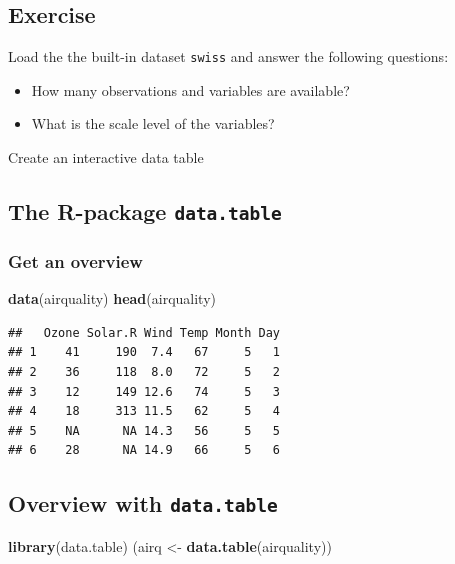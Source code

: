 \documentclass[10pt,]{article}
\newenvironment{Shaded}{\begin{snugshade}}{\end{snugshade}}
\newcommand{\KeywordTok}[1]{\textcolor[rgb]{0.13,0.29,0.53}{\textbf{#1}}}
\newcommand{\StringTok}[1]{\textcolor[rgb]{0.31,0.60,0.02}{#1}}
\newcommand{\NormalTok}[1]{#1}
\providecommand{\tightlist}{%
  \setlength{\itemsep}{0pt}\setlength{\parskip}{0pt}}
\begin{document}
\subsection{Exercise}\label{exercise}

Load the the built-in dataset \texttt{swiss} and answer the following
questions:

\begin{itemize}
\tightlist
\item
  How many observations and variables are available?
\item
  What is the scale level of the variables?
\end{itemize}

Create an interactive data table

\subsection{\texorpdfstring{The R-package
\texttt{data.table}}{The R-package data.table}}\label{the-r-package-data.table}

\subsubsection{Get an overview}\label{get-an-overview}

\begin{Shaded}
\begin{Highlighting}[]
\KeywordTok{data}\NormalTok{(airquality)}
\KeywordTok{head}\NormalTok{(airquality)}
\end{Highlighting}
\end{Shaded}

\begin{verbatim}
##   Ozone Solar.R Wind Temp Month Day
## 1    41     190  7.4   67     5   1
## 2    36     118  8.0   72     5   2
## 3    12     149 12.6   74     5   3
## 4    18     313 11.5   62     5   4
## 5    NA      NA 14.3   56     5   5
## 6    28      NA 14.9   66     5   6
\end{verbatim}

\subsection{\texorpdfstring{Overview with
\texttt{data.table}}{Overview with data.table}}\label{overview-with-data.table}

\begin{Shaded}
\begin{Highlighting}[]
\KeywordTok{library}\NormalTok{(data.table)}
\NormalTok{(airq <-}\StringTok{ }\KeywordTok{data.table}\NormalTok{(airquality))}
\end{Highlighting}
\end{Shaded}
\end{document}

